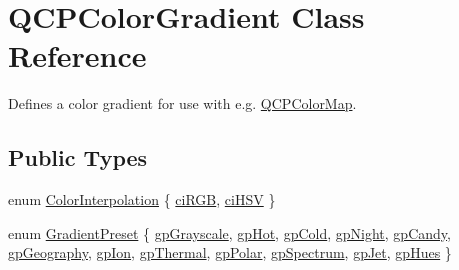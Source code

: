 \hypertarget{class_q_c_p_color_gradient}{}\section{Q\+C\+P\+Color\+Gradient Class Reference}
\label{class_q_c_p_color_gradient}


Defines a color gradient for use with e.\+g. \hyperlink{class_q_c_p_color_map}{Q\+C\+P\+Color\+Map}.  


\subsection*{Public Types}
\begin{DoxyCompactItemize}
\item 
enum \hyperlink{class_q_c_p_color_gradient_ac5dca17cc24336e6ca176610e7f77fc1}{Color\+Interpolation} \{ \hyperlink{class_q_c_p_color_gradient_ac5dca17cc24336e6ca176610e7f77fc1a5e30f725c9cfe93999e268a9f92afbe7}{ci\+R\+GB}, 
\hyperlink{class_q_c_p_color_gradient_ac5dca17cc24336e6ca176610e7f77fc1af14ae62fcae11ecc07234eeaec5856cb}{ci\+H\+SV}
 \}
\item 
enum \hyperlink{class_q_c_p_color_gradient_aed6569828fee337023670272910c9072}{Gradient\+Preset} \{ \newline
\hyperlink{class_q_c_p_color_gradient_aed6569828fee337023670272910c9072add11ae369a86f3b1b6205ec72e5021fb}{gp\+Grayscale}, 
\hyperlink{class_q_c_p_color_gradient_aed6569828fee337023670272910c9072a4f42e534cf6cff5a29a5388094d099b5}{gp\+Hot}, 
\hyperlink{class_q_c_p_color_gradient_aed6569828fee337023670272910c9072aec8c001f62c0d5cb853db5fd85309557}{gp\+Cold}, 
\hyperlink{class_q_c_p_color_gradient_aed6569828fee337023670272910c9072a1bb89351b6def7d220973443fe059c62}{gp\+Night}, 
\newline
\hyperlink{class_q_c_p_color_gradient_aed6569828fee337023670272910c9072a9e72663bf6b94b65945f7843f24e0721}{gp\+Candy}, 
\hyperlink{class_q_c_p_color_gradient_aed6569828fee337023670272910c9072a382f0b07cec1a59d8a533438aea815d2}{gp\+Geography}, 
\hyperlink{class_q_c_p_color_gradient_aed6569828fee337023670272910c9072a4297f4f9e212a819cd65e8e34567182b}{gp\+Ion}, 
\hyperlink{class_q_c_p_color_gradient_aed6569828fee337023670272910c9072af1676b129f9f458ace453f280c731cf7}{gp\+Thermal}, 
\newline
\hyperlink{class_q_c_p_color_gradient_aed6569828fee337023670272910c9072ab7414ce4e36dc3e82e0132a7f0f41b52}{gp\+Polar}, 
\hyperlink{class_q_c_p_color_gradient_aed6569828fee337023670272910c9072ad63adc100ef46f6b4a8a6deacec4642f}{gp\+Spectrum}, 
\hyperlink{class_q_c_p_color_gradient_aed6569828fee337023670272910c9072a5f8a9e67b64c17ddfe4f069fe2b9fb02}{gp\+Jet}, 
\hyperlink{class_q_c_p_color_gradient_aed6569828fee337023670272910c9072a30efe58407acfb67939032f70213a130}{gp\+Hues}
 \}
\end{DoxyCompactItemize}

